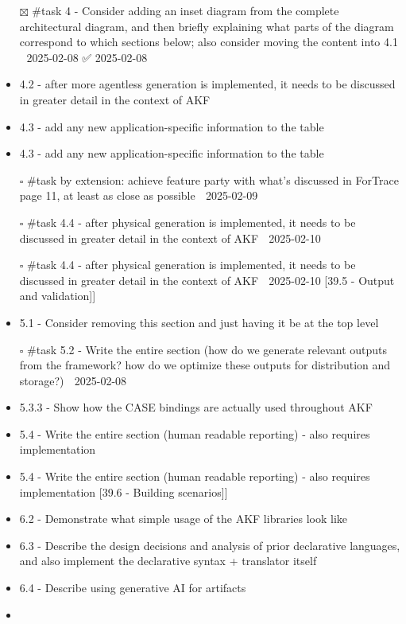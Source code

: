 \begin{itemize}
\item[$\boxtimes$]
  \#task 4 - Consider adding an inset diagram from the complete
  architectural diagram, and then briefly explaining what parts of the
  diagram correspond to which sections below; also consider moving the
  content into 4.1 📅 2025-02-08 ✅ 2025-02-08
\item
  4.2 - after more agentless generation is implemented, it needs to be
  discussed in greater detail in the context of AKF
\item
  4.3 - add any new application-specific information to the table
\item
  4.3 - add any new application-specific information to the table
\item[$\square$]
  \#task by extension: achieve feature party with what's discussed in
  ForTrace page 11, at least as close as possible 📅 2025-02-09
\item[$\square$]
  \#task 4.4 - after physical generation is implemented, it needs to be
  discussed in greater detail in the context of AKF 📅 2025-02-10
\item[$\square$]
  \#task 4.4 - after physical generation is implemented, it needs to be
  discussed in greater detail in the context of AKF 📅 2025-02-10
  {[}39.5 - Output and validation{]}{]}
\item
  5.1 - Consider removing this section and just having it be at the top
  level
\item[$\square$]
  \#task 5.2 - Write the entire section (how do we generate relevant
  outputs from the framework? how do we optimize these outputs for
  distribution and storage?) 📅 2025-02-08
\item
  5.3.3 - Show how the CASE bindings are actually used throughout AKF
\item
  5.4 - Write the entire section (human readable reporting) - also
  requires implementation
\item
  5.4 - Write the entire section (human readable reporting) - also
  requires implementation {[}39.6 - Building scenarios{]}{]}
\item
  6.2 - Demonstrate what simple usage of the AKF libraries look like
\item
  6.3 - Describe the design decisions and analysis of prior declarative
  languages, and also implement the declarative syntax + translator
  itself
\item
  6.4 - Describe using generative AI for artifacts
\item

\end{itemize}
